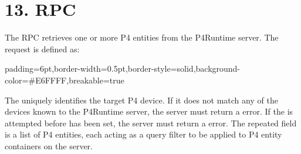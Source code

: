 \documentclass[11pt]{article}
\begin{document}
{%
\section{13.\hspace*{0.5em} RPC}\label{sec-read-rpc}%

\noindent{}The  RPC retrieves one or more P4 entities from the P4Runtime server. The
request is defined as:%

\begin{mdbmargintb}{6pt}{6pt}%
\begin{mdblock}{padding=6pt,border-width=0.5pt,border-style=solid,background-color=\#E6FFFF,breakable=true}%
\begin{mdpre}%
\end{mdpre}%
\end{mdblock}%
\end{mdbmargintb}%

\noindent{}The  uniquely identifies the target P4 device. If it does not match
any of the devices known to the P4Runtime server, the server must return a
 error.
If the  is attempted before  has been set, the
server must return a  error.
The  repeated field is a list of P4 entities, each
acting as a query filter to be applied to P4 entity containers on the server.%

}
\end{document}
